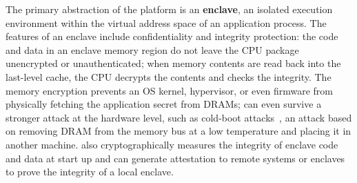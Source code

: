 The primary abstraction of the \sgx{} platform is an {\bf enclave}, an isolated execution environment within the virtual address space of an application process.
The features of an enclave include confidentiality and integrity protection:
the code and data in an enclave memory region do not leave the CPU package unencrypted or unauthenticated; when memory contents are read back into the last-level cache,
the CPU decrypts the contents and checks the integrity.
The memory encryption
prevents an OS kernel, hypervisor, or even firmware from physically fetching the application secret from DRAMs;
\sgx{} can even survive a stronger attack at the hardware level,
such as cold-boot attacks~\cite{halderman09coldboot}, an attack based on removing DRAM from the memory bus at a low temperature and placing it in another machine.
\sgx{} also cryptographically measures the integrity of enclave code and data at start up and
can generate
attestation to remote systems or enclaves to prove the integrity of a local enclave.









